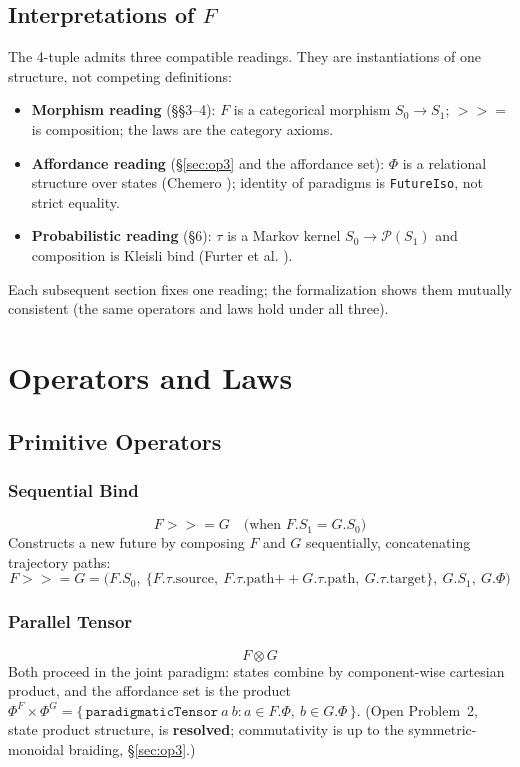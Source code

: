 \documentclass[11pt,a4paper]{article}
\newcommand{\seqBind}{\mathbin{>>=}}
\newcommand{\parTensor}{\otimes}
\begin{document}
\subsection{Interpretations of $F$}

The 4-tuple admits three compatible readings. They are instantiations of one
structure, not competing definitions:
\begin{itemize}
\item \textbf{Morphism reading} (\S\S3--4): $F$ is a categorical morphism
  $S_0 \to S_1$; $\seqBind$ is composition; the laws are the category axioms.
\item \textbf{Affordance reading} (\S\ref{sec:op3} and the affordance set): $\Phi$
  is a relational structure over states (Chemero \cite{chemero2003}); identity
  of paradigms is \texttt{FutureIso}, not strict equality.
\item \textbf{Probabilistic reading} (\S6): $\tau$ is a Markov kernel
  $S_0 \to \mathcal{P}(S_1)$ and composition is Kleisli bind (Furter et al.
  \cite{furter2025}).
\end{itemize}
Each subsequent section fixes one reading; the formalization shows them
mutually consistent (the same operators and laws hold under all three).

\section{Operators and Laws}

\subsection{Primitive Operators}

\subsubsection{Sequential Bind}
\[
F \seqBind G \quad \text{(when } F.S_1 = G.S_0 \text{)}
\]
Constructs a new future by composing $F$ and $G$ sequentially, concatenating
trajectory paths:
\[
F \seqBind G = \big(F.S_0,\ \{F.\tau.\text{source},\
F.\tau.\text{path} \mathbin{+\!\!+} G.\tau.\text{path},\
G.\tau.\text{target}\},\ G.S_1,\ G.\Phi\big)
\]

\subsubsection{Parallel Tensor}
\[
F \parTensor G
\]
Both proceed in the joint paradigm: states combine by component-wise
cartesian product, and the affordance set is the product
$\Phi^{F} \times \Phi^{G} = \{\,\texttt{paradigmaticTensor}~a~b : a \in F.\Phi,\
b \in G.\Phi\,\}$. (Open Problem~2, state product structure, is
\textbf{resolved}; commutativity is up to the symmetric-monoidal braiding,
\S\ref{sec:op3}.)
\end{document}
